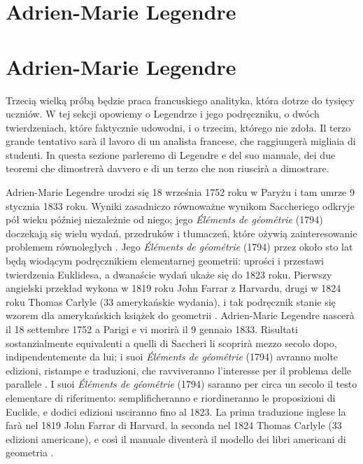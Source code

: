 
\section{Adrien-Marie Legendre} %
\section{Adrien-Marie Legendre} %
\label{sekcja_legendre}

Trzecią wielką próbą będzie praca francuskiego analityka, która dotrze do tysięcy uczniów. %
W tej sekcji opowiemy o Legendrze i jego podręczniku, o dwóch twierdzeniach, które faktycznie udowodni, i o trzecim, którego nie zdoła. %
Il terzo grande tentativo sarà il lavoro di un analista francese, che raggiungerà migliaia di studenti. %
In questa sezione parleremo di Legendre e del suo manuale, dei due teoremi che dimostrerà davvero e di un terzo che non riuscirà a dimostrare. %

Adrien-Marie Legendre urodzi się 18 września 1752 roku w Paryżu i tam umrze 9 stycznia 1833 roku. %
Wyniki zasadniczo równoważne wynikom Saccheriego odkryje pół wieku później niezależnie od niego; jego \emph{Éléments de géométrie} (1794) doczekają się wielu wydań, przedruków i tłumaczeń, które ożywią zainteresowanie problemem równoległych \cite[s. 306]{hartshorne_2000}. %
Jego \emph{Éléments de géométrie} (1794) przez około sto lat będą wiodącym podręcznikiem elementarnej geometrii: uprości i przestawi twierdzenia Euklidesa, a dwanaście wydań ukaże się do 1823 roku. %
Pierwszy angielski przekład wykona w 1819 roku John Farrar z Harvardu, drugi w 1824 roku Thomas Carlyle (33 amerykańskie wydania), i tak podręcznik stanie się wzorem dla amerykańskich książek do geometrii \cite[s. 286]{eves1_1972}. %
Adrien-Marie Legendre nascerà il 18 settembre 1752 a Parigi e vi morirà il 9 gennaio 1833. %
Risultati sostanzialmente equivalenti a quelli di Saccheri li scoprirà mezzo secolo dopo, indipendentemente da lui; i suoi \emph{Éléments de géométrie} (1794) avranno molte edizioni, ristampe e traduzioni, che ravviveranno l'interesse per il problema delle parallele \cite[p. 306]{hartshorne_2000}. %
I suoi \emph{Éléments de géométrie} (1794) saranno per circa un secolo il testo elementare di riferimento: semplificheranno e riordineranno le proposizioni di Euclide, e dodici edizioni usciranno fino al 1823. %
La prima traduzione inglese la farà nel 1819 John Farrar di Harvard, la seconda nel 1824 Thomas Carlyle (33 edizioni americane), e così il manuale diventerà il modello dei libri americani di geometria \cite[p. 286]{eves1_1972}. %
%
%
%

